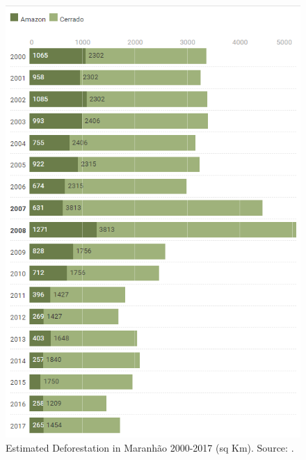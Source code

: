 \begin{figure}[H]
  \centering
  \includegraphics[width=1\textwidth, inner]{Chapter2/ChartMA_deforestation_chapter2.png}
\caption[Estimated Deforestation in Maranhão 2000-2017]{Estimated Deforestation in Maranhão 2000-2017 (sq Km). Source: \citep{MMMAwebsite}.}
\label{fig:defAmazonMA}
\end{figure}


